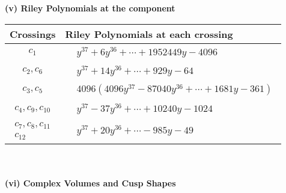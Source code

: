 \documentclass[1p]{elsarticle_modified}
\theoremstyle{definition}
\begin{document}
\newpage\renewcommand{\arraystretch}{1}
\flushleft \textbf{(v) Riley Polynomials at the component}\newline \\
\begin{tabular}{m{50pt}|m{274pt}}
Crossings & \hspace{64pt}Riley Polynomials at each crossing \\
\hline $$\begin{aligned}c_{1}\end{aligned}$$&$\begin{aligned}
&y^{37}+6 y^{36}+\cdots+1952449 y-4096
\end{aligned}$\\
\hline $$\begin{aligned}c_{2},c_{6}\end{aligned}$$&$\begin{aligned}
&y^{37}+14 y^{36}+\cdots+929 y-64
\end{aligned}$\\
\hline $$\begin{aligned}c_{3},c_{5}\end{aligned}$$&$\begin{aligned}
&4096(4096 y^{37}-87040 y^{36}+\cdots+1681 y-361)
\end{aligned}$\\
\hline $$\begin{aligned}c_{4},c_{9},c_{10}\end{aligned}$$&$\begin{aligned}
&y^{37}-37 y^{36}+\cdots+10240 y-1024
\end{aligned}$\\
\hline $$\begin{aligned}c_{7},c_{8},c_{11}\\c_{12}\end{aligned}$$&$\begin{aligned}
&y^{37}+20 y^{36}+\cdots-985 y-49
\end{aligned}$\\
\hline
\end{tabular}\\~\\
\newpage\flushleft \textbf{(vi) Complex Volumes and Cusp Shapes}
\end{document}
